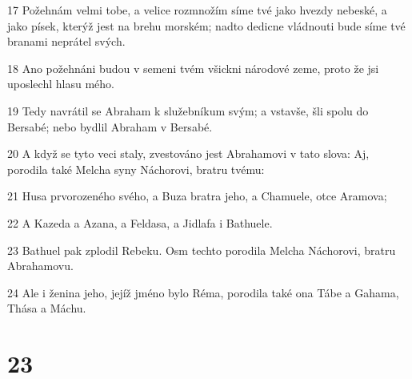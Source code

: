 \par 17 Požehnám velmi tobe, a velice rozmnožím síme tvé jako hvezdy nebeské, a jako písek, kterýž jest na brehu morském; nadto dedicne vládnouti bude síme tvé branami neprátel svých.
\par 18 Ano požehnáni budou v semeni tvém všickni národové zeme, proto že jsi uposlechl hlasu mého.
\par 19 Tedy navrátil se Abraham k služebníkum svým; a vstavše, šli spolu do Bersabé; nebo bydlil Abraham v Bersabé.
\par 20 A když se tyto veci staly, zvestováno jest Abrahamovi v tato slova: Aj, porodila také Melcha syny Náchorovi, bratru tvému:
\par 21 Husa prvorozeného svého, a Buza bratra jeho, a Chamuele, otce Aramova;
\par 22 A Kazeda a Azana, a Feldasa, a Jidlafa i Bathuele.
\par 23 Bathuel pak zplodil Rebeku. Osm techto porodila Melcha Náchorovi, bratru Abrahamovu.
\par 24 Ale i ženina jeho, jejíž jméno bylo Réma, porodila také ona Tábe a Gahama, Thása a Máchu.

\chapter{23}

